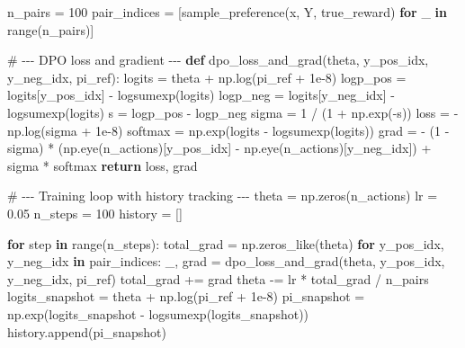 \documentclass[
  letterpaper,
  numbers=noenddot,
  DIV=11]{scrreprt}
\newenvironment{Shaded}{\begin{snugshade}}{\end{snugshade}}
\newcommand{\BuiltInTok}[1]{\textcolor[rgb]{0.00,0.23,0.31}{#1}}
\newcommand{\CommentTok}[1]{\textcolor[rgb]{0.37,0.37,0.37}{#1}}
\newcommand{\ControlFlowTok}[1]{\textcolor[rgb]{0.00,0.23,0.31}{\textbf{#1}}}
\newcommand{\DecValTok}[1]{\textcolor[rgb]{0.68,0.00,0.00}{#1}}
\newcommand{\FloatTok}[1]{\textcolor[rgb]{0.68,0.00,0.00}{#1}}
\newcommand{\KeywordTok}[1]{\textcolor[rgb]{0.00,0.23,0.31}{\textbf{#1}}}
\newcommand{\NormalTok}[1]{\textcolor[rgb]{0.00,0.23,0.31}{#1}}
\newcommand{\OperatorTok}[1]{\textcolor[rgb]{0.37,0.37,0.37}{#1}}
\theoremstyle{plain}
\theoremstyle{definition}
\theoremstyle{remark}
\begin{document}
\begin{Shaded}
\begin{Highlighting}[numbers=left,,]
\NormalTok{n\_pairs }\OperatorTok{=} \DecValTok{100}
\NormalTok{pair\_indices }\OperatorTok{=}\NormalTok{ [sample\_preference(x, Y, true\_reward) }\ControlFlowTok{for}\NormalTok{ \_ }\KeywordTok{in} \BuiltInTok{range}\NormalTok{(n\_pairs)]}

\CommentTok{\# {-}{-}{-} DPO loss and gradient {-}{-}{-}}
\KeywordTok{def}\NormalTok{ dpo\_loss\_and\_grad(theta, y\_pos\_idx, y\_neg\_idx, pi\_ref):}
\NormalTok{    logits }\OperatorTok{=}\NormalTok{ theta }\OperatorTok{+}\NormalTok{ np.log(pi\_ref }\OperatorTok{+} \FloatTok{1e{-}8}\NormalTok{)}
\NormalTok{    logp\_pos }\OperatorTok{=}\NormalTok{ logits[y\_pos\_idx] }\OperatorTok{{-}}\NormalTok{ logsumexp(logits)}
\NormalTok{    logp\_neg }\OperatorTok{=}\NormalTok{ logits[y\_neg\_idx] }\OperatorTok{{-}}\NormalTok{ logsumexp(logits)}
\NormalTok{    s }\OperatorTok{=}\NormalTok{ logp\_pos }\OperatorTok{{-}}\NormalTok{ logp\_neg}
\NormalTok{    sigma }\OperatorTok{=} \DecValTok{1} \OperatorTok{/}\NormalTok{ (}\DecValTok{1} \OperatorTok{+}\NormalTok{ np.exp(}\OperatorTok{{-}}\NormalTok{s))}
\NormalTok{    loss }\OperatorTok{=} \OperatorTok{{-}}\NormalTok{np.log(sigma }\OperatorTok{+} \FloatTok{1e{-}8}\NormalTok{)}
\NormalTok{    softmax }\OperatorTok{=}\NormalTok{ np.exp(logits }\OperatorTok{{-}}\NormalTok{ logsumexp(logits))}
\NormalTok{    grad }\OperatorTok{=} \OperatorTok{{-}}\NormalTok{ (}\DecValTok{1} \OperatorTok{{-}}\NormalTok{ sigma) }\OperatorTok{*}\NormalTok{ (np.eye(n\_actions)[y\_pos\_idx] }\OperatorTok{{-}}\NormalTok{ np.eye(n\_actions)[y\_neg\_idx]) }\OperatorTok{+}\NormalTok{ sigma }\OperatorTok{*}\NormalTok{ softmax}
    \ControlFlowTok{return}\NormalTok{ loss, grad}

\CommentTok{\# {-}{-}{-} Training loop with history tracking {-}{-}{-}}
\NormalTok{theta }\OperatorTok{=}\NormalTok{ np.zeros(n\_actions)}
\NormalTok{lr }\OperatorTok{=} \FloatTok{0.05}
\NormalTok{n\_steps }\OperatorTok{=} \DecValTok{100}
\NormalTok{history }\OperatorTok{=}\NormalTok{ []}

\ControlFlowTok{for}\NormalTok{ step }\KeywordTok{in} \BuiltInTok{range}\NormalTok{(n\_steps):}
\NormalTok{    total\_grad }\OperatorTok{=}\NormalTok{ np.zeros\_like(theta)}
    \ControlFlowTok{for}\NormalTok{ y\_pos\_idx, y\_neg\_idx }\KeywordTok{in}\NormalTok{ pair\_indices:}
\NormalTok{        \_, grad }\OperatorTok{=}\NormalTok{ dpo\_loss\_and\_grad(theta, y\_pos\_idx, y\_neg\_idx, pi\_ref)}
\NormalTok{        total\_grad }\OperatorTok{+=}\NormalTok{ grad}
\NormalTok{    theta }\OperatorTok{{-}=}\NormalTok{ lr }\OperatorTok{*}\NormalTok{ total\_grad }\OperatorTok{/}\NormalTok{ n\_pairs}
\NormalTok{    logits\_snapshot }\OperatorTok{=}\NormalTok{ theta }\OperatorTok{+}\NormalTok{ np.log(pi\_ref }\OperatorTok{+} \FloatTok{1e{-}8}\NormalTok{)}
\NormalTok{    pi\_snapshot }\OperatorTok{=}\NormalTok{ np.exp(logits\_snapshot }\OperatorTok{{-}}\NormalTok{ logsumexp(logits\_snapshot))}
\NormalTok{    history.append(pi\_snapshot)}


\end{Highlighting}
\end{Shaded}
\end{document}
